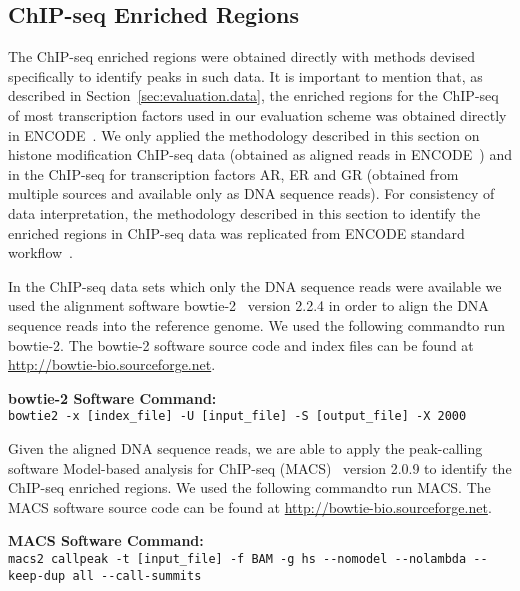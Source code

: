 \subsection{ChIP-seq Enriched Regions}
\label{sec:chipseq.enriched.regions}

The ChIP-seq enriched regions were obtained directly with methods devised specifically to identify peaks in such data. It is important to mention that, as described in Section~\ref{sec:evaluation.data}, the enriched regions for the ChIP-seq of most transcription factors used in our evaluation scheme was obtained directly in ENCODE~\cite{encode2012}. We only applied the methodology described in this section on histone modification ChIP-seq data (obtained as aligned reads in ENCODE~\cite{encode2012}) and in the ChIP-seq for transcription factors AR, ER and GR (obtained from multiple sources and available only as DNA sequence reads). For consistency of data interpretation, the methodology described in this section to identify the enriched regions in ChIP-seq data was replicated from ENCODE standard workflow~\cite{encode2012}.

In the ChIP-seq data sets which only the DNA sequence reads were available we used the alignment software bowtie-2~\cite{langmead2012} version 2.2.4 in order to align the DNA sequence reads into the reference genome. We used the following commandto run bowtie-2. The bowtie-2 software source code and index files can be found at \url{http://bowtie-bio.sourceforge.net}.

\vspace{0.3cm}
\noindent
\textbf{bowtie-2 Software Command:}\\
\texttt{bowtie2 -x [index\_file] -U [input\_file] -S [output\_file] -X 2000}
\vspace{0.3cm}

Given the aligned DNA sequence reads, we are able to apply the peak-calling software Model-based analysis for ChIP-seq (MACS)~\cite{zhang2008} version 2.0.9 to identify the ChIP-seq enriched regions. We used the following commandto run MACS. The MACS software source code can be found at \url{http://bowtie-bio.sourceforge.net}.

\vspace{0.3cm}
\noindent
\textbf{MACS Software Command:}\\
\texttt{macs2 callpeak -t [input\_file] -f BAM -g hs -{}-nomodel -{}-nolambda -{}-keep-dup all -{}-call-summits}
\vspace{0.3cm}

